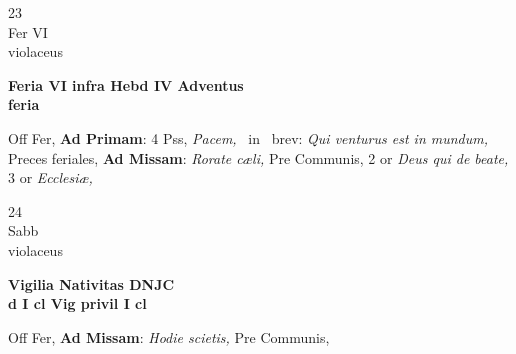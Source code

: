 \documentclass[10pt, openany]{book}
\begin{document}
        \begin{center}
            \begin{minipage}{3.5in}
                \vspace{2em}
                \begin{minipage}{0.5in}
                    {\Huge 23} \\
                    {\normalsize Fer VI} \\
                    {\normalsize violaceus}
                \end{minipage}
                \begin{minipage}{3.0in}
                    \textbf{ \large Feria VI infra Hebd IV Adventus \\
                    \textnormal{\normalsize feria}} \\ 
                \end{minipage}
                \begin{justify}Off Fer, \textbf{Ad Primam}: 4 Pss, \textit{Pacem,} \Vbar\ in \Rbar\ brev: \textit{Qui venturus est in mundum,} Preces feriales, \textbf{Ad Missam}: \textit{Rorate cæli,} Pre Communis, 2 or \textit{Deus qui de beate,} 3 or \textit{Ecclesiæ,}  
                \end{justify}
            \end{minipage}
        \end{center}
    
        \begin{center}
            \begin{minipage}{3.5in}
                \vspace{2em}
                \begin{minipage}{0.5in}
                    {\Huge 24} \\
                    {\normalsize Sabb} \\
                    {\normalsize violaceus}
                \end{minipage}
                \begin{minipage}{3.0in}
                    \textbf{ \large Vigilia Nativitas DNJC \\
                    \textnormal{\normalsize d I cl Vig privil I cl}} \\ 
                \end{minipage}
                \begin{justify}Off Fer, \textbf{Ad Missam}: \textit{Hodie scietis,} Pre Communis,  
                \end{justify}
            \end{minipage}
        \end{center}
    
\end{document}
